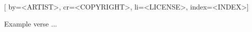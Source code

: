 

[%
    by={<ARTIST>},
    cr={<COPYRIGHT>},
    li={<LICENSE>},
    index={<INDEX>}]


    \label{<INDEX>}

    \beginverse
        Example verse ...
    \endverse
\endsong
